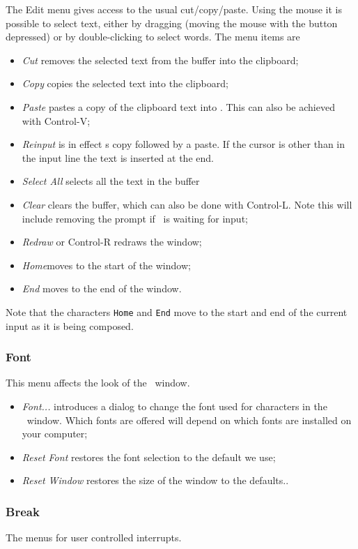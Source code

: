 The Edit menu gives access to the usual cut/copy/paste.
Using the mouse it is possible to select text, either by dragging
(moving the mouse with the button depressed) or by double-clicking to
select words.  The menu items are
\begin{itemize}
\item{\em Cut} removes the selected text from the buffer into the clipboard;
\item{\em Copy} copies the selected text into the clipboard;
\item{\em Paste} pastes a copy of the clipboard text into \REDUCE.  This
  can also be achieved with Control-V;
\item{\em Reinput} is in effect s copy followed by a paste.  If the
  cursor is other than in the input line the text is inserted at the end.
\item{\em Select All} selects all the text in the buffer
\item{\em Clear} clears the buffer, which can also be done with Control-L.
  Note this will include removing the prompt if \REDUCE\ is waiting
  for input; 
\item{\em Redraw} or Control-R redraws the window;
\item{\em Home}moves to the start of the window;
\item{\em End} moves to the end of the window.
\end{itemize}
Note that the characters {\tt Home} and {\tt End} move to the start
and end of the current input as it is being composed.

\subsubsection{Font}

This menu affects the look of the \REDUCE\ window.

\begin{itemize}
\item{\em Font...} introduces a dialog to change the font used for characters
  in the \REDUCE\ window.  Which fonts are offered will depend on
  which fonts are installed on your computer;
\item{\em Reset Font} restores the font selection to the default we use;
\item{\em Reset Window} restores the size of the window to the defaults..
\end{itemize}


\subsubsection{Break}
The menus for user controlled interrupts.

